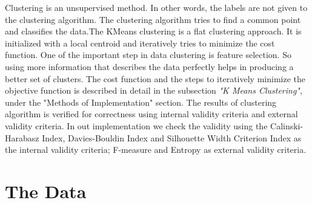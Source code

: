 \documentclass[conference]{IEEEtran}
\begin{document}
Clustering is an unsupervised method. In other words, the labels are not given to the clustering algorithm. The clustering algorithm tries to find a common point and classifies the data.The KMeans clustering is a flat clustering approach. It is initialized with a local centroid and iteratively tries to minimize the cost function. One of the important step in data clustering is feature selection. So using more information that describes the data perfectly helps in producing a better set of clusters.  The cost function and the steps to iteratively minimize the objective function  is described in detail in the subsection {\sl"K Means Clustering"}, under the "Methods of Implementation" section. The results of clustering algorithm is verified for correctness using internal validity criteria and external validity criteria. In out implementation we check the validity using the Calinski-Harabasz Index, Davies-Bouldin Index and Silhouette Width Criterion Index as the internal validity criteria; F-measure and Entropy as external validity criteria.

\section{The Data}
\end{document}
